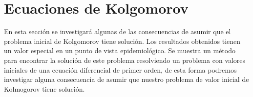 \section{Ecuaciones de Kolgomorov}
\begin{comment}
    Usando la ecuación de Chapman-Kolgomorov se obtiene que
    $$P_{m,n}(s,t)=\sum_{k=0}^\infty P_{m,k}(s,u)P_{k,n}(u,t),$$
    $$\Pi_{i,j}(s,t)=\sum_{k=0}^{N_2} \Pi_{i,k}(s,u)\Pi_{k,j}(u,t),$$
\end{comment}

En esta sección se investigará algunas de las consecuencias de asumir que el problema inicial de Kolgomorov tiene solución. Los resultados obtenidos tienen un valor especial en un punto de vista epidemiológico. Se muestra un método para encontrar la solución de este problema resolviendo un problema con valores iniciales de una ecuación diferencial de primer orden, de esta forma podremos investigar alguna consecuencia de asumir que nuestro problema de valor inicial de Kolmogorov tiene solución.

